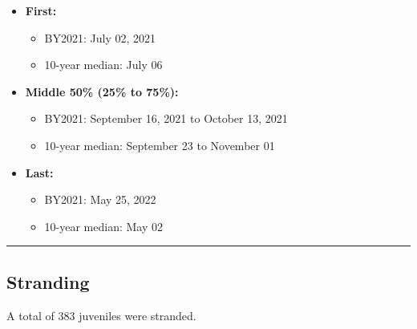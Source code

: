 \documentclass[
]{book}
\providecommand{\tightlist}{%
  \setlength{\itemsep}{0pt}\setlength{\parskip}{0pt}}
\theoremstyle{definition}
\theoremstyle{definition}
\theoremstyle{definition}
\theoremstyle{definition}
\theoremstyle{remark}
\begin{document}
\begin{itemize}
\tightlist
\item
  \textbf{First:}

  \begin{itemize}
  \tightlist
  \item
    BY2021: July 02, 2021
  \item
    10-year median: July 06
  \end{itemize}
\item
  \textbf{Middle 50\% (25\% to 75\%):}

  \begin{itemize}
  \tightlist
  \item
    BY2021: September 16, 2021 to October 13, 2021
  \item
    10-year median: September 23 to November 01
  \end{itemize}
\item
  \textbf{Last:}

  \begin{itemize}
  \tightlist
  \item
    BY2021: May 25, 2022
  \item
    10-year median: May 02
  \end{itemize}
\end{itemize}

\begin{center}\rule{0.5\linewidth}{0.5pt}\end{center}

\hypertarget{stranding}{%
\subsection{Stranding}\label{stranding}}

A total of 383 juveniles were stranded.
\end{document}
